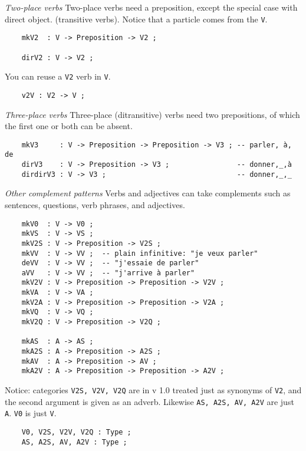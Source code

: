\documentclass[11pt,a4paper]{article}
\newcommand{\subsubsubsection}[1]{\textit{#1}}
\begin{document}
\subsubsubsection{Two-place verbs}
Two-place verbs need a preposition, except the special case with direct object.
(transitive verbs). Notice that a particle comes from the \texttt{V}.

\begin{verbatim}
    mkV2  : V -> Preposition -> V2 ;
  
    dirV2 : V -> V2 ;
\end{verbatim}

You can reuse a \texttt{V2} verb in \texttt{V}.

\begin{verbatim}
    v2V : V2 -> V ;
\end{verbatim}

\subsubsubsection{Three-place verbs}
Three-place (ditransitive) verbs need two prepositions, of which
the first one or both can be absent.

\begin{verbatim}
    mkV3     : V -> Preposition -> Preposition -> V3 ; -- parler, à, de
    dirV3    : V -> Preposition -> V3 ;                -- donner,_,à
    dirdirV3 : V -> V3 ;                               -- donner,_,_
\end{verbatim}

\subsubsubsection{Other complement patterns}
Verbs and adjectives can take complements such as sentences,
questions, verb phrases, and adjectives.

\begin{verbatim}
    mkV0  : V -> V0 ;
    mkVS  : V -> VS ;
    mkV2S : V -> Preposition -> V2S ;
    mkVV  : V -> VV ;  -- plain infinitive: "je veux parler"
    deVV  : V -> VV ;  -- "j'essaie de parler"
    aVV   : V -> VV ;  -- "j'arrive à parler"
    mkV2V : V -> Preposition -> Preposition -> V2V ;
    mkVA  : V -> VA ;
    mkV2A : V -> Preposition -> Preposition -> V2A ;
    mkVQ  : V -> VQ ;
    mkV2Q : V -> Preposition -> V2Q ;
  
    mkAS  : A -> AS ;
    mkA2S : A -> Preposition -> A2S ;
    mkAV  : A -> Preposition -> AV ;
    mkA2V : A -> Preposition -> Preposition -> A2V ;
\end{verbatim}

Notice: categories \texttt{V2S, V2V, V2Q} are in v 1.0 treated
just as synonyms of \texttt{V2}, and the second argument is given
as an adverb. Likewise \texttt{AS, A2S, AV, A2V} are just \texttt{A}.
\texttt{V0} is just \texttt{V}.

\begin{verbatim}
    V0, V2S, V2V, V2Q : Type ;
    AS, A2S, AV, A2V : Type ;
\end{verbatim}
\end{document}
